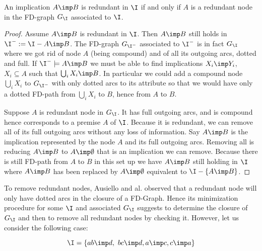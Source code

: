 \begin{proposition} An implication $A \imp B$ is redundant in $\I$ if and only if $A$ is a redundant node in the FD-graph $G_{\I}$ associated to $\I$.
\end{proposition}

\begin{proof} Assume $A \imp B$ is redundant in $\I$. Then $A \imp B$ still holds in $\I^{-} := \I - {A \imp B}$. The FD-graph $G_{\I^{-}}$ associated to 
$\I^{-}$ is in fact $G_{\I}$ where we got rid of node $A$ (being compound) and
of all its outgoing arcs, dotted and full. If $\I^{-} \models A \imp B$ we must be able to find implications $X_i \imp Y_i$, $X_i \subseteq A$ such that $\bigcup_{i} X_i \imp B$. In particular we could add a compound node $\bigcup_i X_i$ to $G_{\I^{-}}$ with only dotted arcs to its attribute so that
we would have only a dotted FD-path from $\bigcup_i X_i$ to $B$, hence from $A$
to $B$.

\vspace{1.2em}

Suppose $A$ is redundant node in $G_{\I}$. It has full outgoing arcs, and is
compound hence corresponds to a premise $A$ of $\I$. Because it is redundant, we
can remove all of its full outgoing arcs without any loss of information. Say
$A \imp B$ is the implication represented by the node $A$ and its full outgoing
arcs. Removing all is reducing $A \imp B$ to $A \imp \emptyset$ that is an
implication we can remove. Because there is still FD-path from $A$ to $B$ in this set up we have $A \imp B$ still holding in $\I$ where $A \imp B$ has been
replaced by $A \imp \emptyset$ equivalent to $\I - \{ A \imp B \}$.

\end{proof}

To remove redundant nodes, Ausiello and al. observed that a redundant node will
only have dotted arcs in the closure of a FD-Graph. Hence its minimization procedure for some $\I$ and associated $G_{\I}$ suggests to determine the closure of $G_{\I}$ and then to remove all redundant nodes by checking it. However, let us consider the following case:

\[ \I = \{ ab \imp d, \ bc \imp d, a \imp c, c \imp a \} \]

